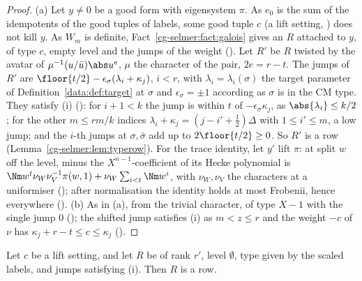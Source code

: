 \begin{proof}
(a) Let $y\ne0$ be a good form with eigensystem $\pi$. As $e_0$ is the sum of the idempotents of the
good tuples of labels, some good tuple $c$ (a lift setting, )
does not kill $y$. As $W_m$ is definite, Fact~\ref{cg-selmer:fact:galois} gives an $R$ attached to
$y$, of type $c$, empty level and the jumps of the weight
(). Let $R'$ be $R$ twisted by the avatar of
$\mu^{-1}(u/\bar u)\abs u^{e}$, $\mu$ the character of the pair, $2e=r-t$. The jumps of $R'$ are
$\floor{t/2}-\epsilon_\sigma(\lambda_i+\kappa_j)$, $i<r$, with $\lambda_i=\lambda_i(\sigma)$ the target
parameter of Definition~\ref{data:def:target} at $\sigma$ and
$\epsilon_\sigma=\pm1$ according as $\sigma$ is in the CM type. They satisfy (i)
(): for $i+1<k$ the jump is within $t$ of
$-\epsilon_\sigma\kappa_j$, as $\abs{\lambda_i}\le k/2$; for the other $m\le rm/k$ indices
$\lambda_i+\kappa_j=(j-i'+\frac12)\Delta$ with $1\le i'\le m$, a low jump; and the $i$-th jumps at
$\sigma,\bar\sigma$ add up to $2\floor{t/2}\ge0$. So $R'$ is a row (Lemma~\ref{cg-selmer:lem:typerow}). For the trace identity, let $y'$ lift $\pi$: at split $w$ off the
level, minus the $X^{n-1}$-coefficient of its Hecke polynomial is
$\Nm w^{t}\nu_W\nu_V^{-1}\pi(w,1)+\nu_W\sum_{i<t}\Nm w^i$, with $\nu_W,\nu_V$ the characters at a
uniformiser (); after normalisation the
identity holds at most Frobenii, hence everywhere (). (b) As in (a), from the trivial character, of
type $X-1$ with the single jump $0$ (); the shifted jump satisfies
(i) as $m<z\le r$ and the weight $-c$ of $\nu$ has $\kappa_j+r-t\le c\le\kappa_j$
().
\end{proof}

\begin{lemma}\label{cg-selmer:lem:typerow}
Let $c$ be a lift setting, and let $R$ be of rank $r'$, level $\emptyset$, type given by the scaled
labels, and jumps satisfying (i). Then $R$ is a row.
\end{lemma}

